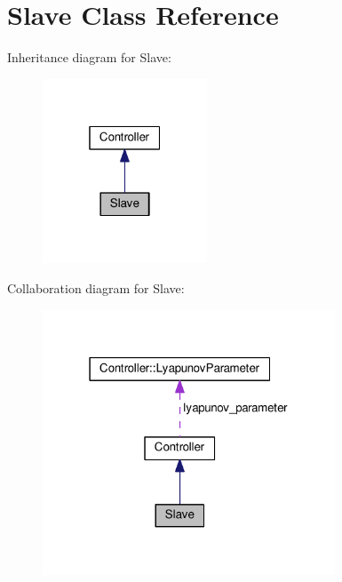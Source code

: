 \hypertarget{classSlave}{}\section{Slave Class Reference}
\label{classSlave}


Inheritance diagram for Slave\+:\nopagebreak
\begin{figure}[H]
\begin{center}
\leavevmode
\includegraphics[width=139pt]{classSlave__inherit__graph}
\end{center}
\end{figure}


Collaboration diagram for Slave\+:
\nopagebreak
\begin{figure}[H]
\begin{center}
\leavevmode
\includegraphics[width=247pt]{classSlave__coll__graph}
\end{center}
\end{figure}
